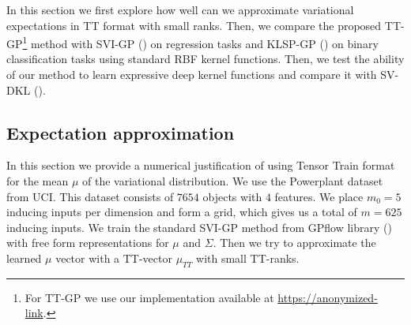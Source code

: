 In this section we first explore how well can we approximate variational
expectations in TT format with small ranks.
Then, we compare the proposed TT-GP\footnote{For TT-GP we use our implementation available at
\url{https://anonymized-link}.} method with SVI-GP (\citet{hensman2013}) on regression tasks and KLSP-GP
(\citet{hensman2015}) on binary classification tasks using standard RBF kernel
functions. Then, we test the ability of our method to learn
expressive deep kernel functions and compare it with SV-DKL
(\citet{wilson2016stochastic}).

\subsection{Expectation approximation}
\label{expect_approx}

In this section we provide a numerical justification of using Tensor Train
format for the mean $\mu$ of the variational distribution. We use the Powerplant
dataset from UCI. This dataset consists of $7654$ objects with $4$ features. We place 
$m_0 = 5$ inducing inputs per dimension and form a grid, which gives us a total of $m = 625$
inducing inputs. We train the standard SVI-GP method from GPflow library
(\citet{GPflow2016}) with free form representations for $\mu$ and $\Sigma$.
Then we try to approximate the learned $\mu$ vector with a TT-vector 
$\mu_{TT}$ with small TT-ranks. 

